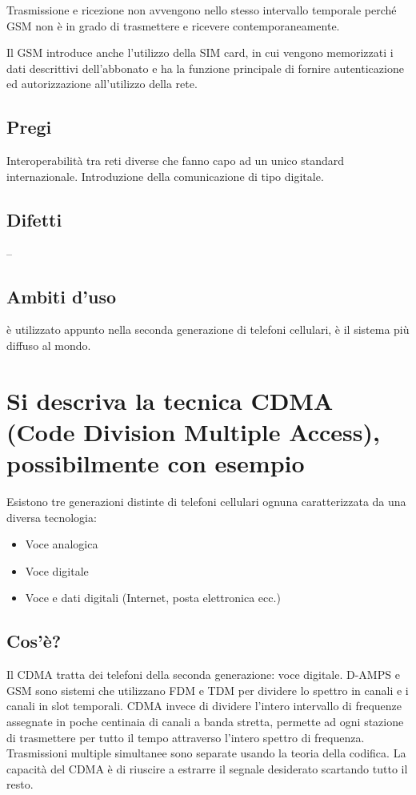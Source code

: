 Trasmissione e ricezione non avvengono nello stesso intervallo temporale perché GSM non è in grado di trasmettere e ricevere contemporaneamente.

Il GSM introduce anche l’utilizzo della SIM card, in cui vengono memorizzati i dati descrittivi dell’abbonato e ha la funzione principale di fornire autenticazione ed autorizzazione all’utilizzo della rete.

\subsection{Pregi}
Interoperabilità tra reti diverse che fanno capo ad un unico standard internazionale.
Introduzione della comunicazione di tipo digitale.
\subsection{Difetti}
--
\subsection{Ambiti d'uso}
è utilizzato appunto nella seconda generazione di telefoni cellulari, è il sistema più diffuso al mondo.
\section{Si descriva la tecnica CDMA (Code Division Multiple Access), possibilmente con esempio}
Esistono tre generazioni distinte di telefoni cellulari ognuna caratterizzata da una diversa tecnologia:
\begin{itemize}
\item	Voce analogica
\item	Voce digitale
\item	Voce e dati digitali (Internet, posta elettronica ecc.)
\end{itemize}
\subsection{Cos'è?}
Il CDMA tratta dei telefoni della seconda generazione: voce digitale.
D-AMPS e GSM sono sistemi che utilizzano FDM e TDM per dividere lo spettro in canali e i canali in slot temporali. CDMA invece di dividere l’intero intervallo di frequenze assegnate in poche centinaia di canali a banda stretta, permette ad ogni stazione di trasmettere per tutto il tempo attraverso l’intero spettro di frequenza. Trasmissioni multiple simultanee sono separate usando la teoria della codifica. La capacità del CDMA è di riuscire a estrarre il segnale desiderato scartando tutto il resto.

